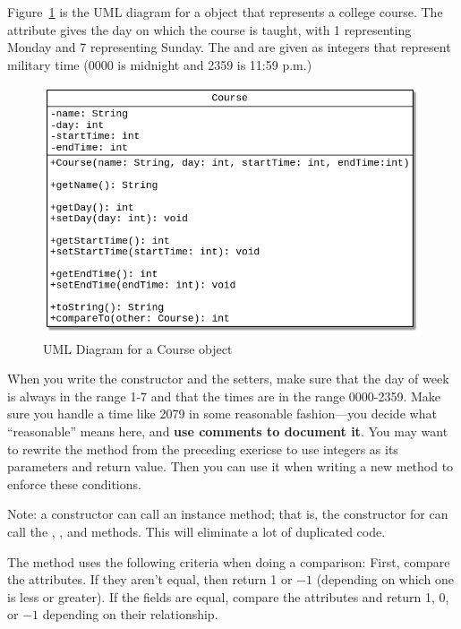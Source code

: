 \begin{exercise}
Figure~\ref{fig.courseuml} is the UML diagram for a  object that represents a college course. The  attribute gives the day on which the course is taught, with 1 representing Monday and 7 representing Sunday. The  and  are given as integers that represent military time (0000 is midnight and 2359 is 11:59 p.m.)

\begin{figure}[!h]
\begin{center}
\includegraphics[scale=0.5]{figs/ch12/course.png}
\caption{UML Diagram for a Course object}
\label{fig.courseuml}
\end{center}
\end{figure}

When you write the constructor and the setters, make sure that the day of week is always in the range 1-7 and that the times are in the range 0000-2359. Make sure you handle a time like 2079 in some reasonable fashion---you decide what ``reasonable'' means here, and {\bf use comments to document it}. You may want to rewrite the  method from the preceding exericse to use integers as its parameters and return value. Then you can use it when writing a new  method to enforce these conditions.

Note: a constructor can call an instance method; that is, the constructor for  can call the , , and  methods. This will eliminate a lot of duplicated code.

The  method uses the following criteria when doing a comparison: First, compare the  attributes. If they aren't equal, then return 1 or $-1$ (depending on which one is less or greater). If the  fields are equal, compare the  attributes and return 1, 0, or $-1$ depending on their relationship.


\end{exercise}
